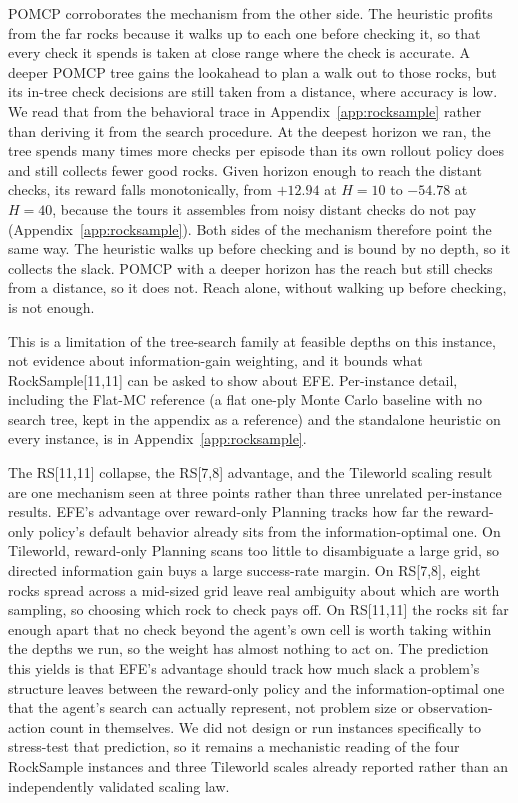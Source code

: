POMCP corroborates the mechanism from the other side. The heuristic profits from the far rocks because it walks up to each one before checking it, so that every check it spends is taken at close range where the check is accurate. A deeper POMCP tree gains the lookahead to plan a walk out to those rocks, but its in-tree check decisions are still taken from a distance, where accuracy is low. We read that from the behavioral trace in Appendix~\ref{app:rocksample} rather than deriving it from the search procedure. At the deepest horizon we ran, the tree spends many times more checks per episode than its own rollout policy does and still collects fewer good rocks. Given horizon enough to reach the distant checks, its reward falls monotonically, from $+12.94$ at $H{=}10$ to $-54.78$ at $H{=}40$, because the tours it assembles from noisy distant checks do not pay (Appendix~\ref{app:rocksample}). Both sides of the mechanism therefore point the same way. The heuristic walks up before checking and is bound by no depth, so it collects the slack. POMCP with a deeper horizon has the reach but still checks from a distance, so it does not. Reach alone, without walking up before checking, is not enough.

This is a limitation of the tree-search family at feasible depths on this instance, not evidence about information-gain weighting, and it bounds what RockSample[11,11] can be asked to show about EFE. Per-instance detail, including the Flat-MC reference (a flat one-ply Monte Carlo baseline with no search tree, kept in the appendix as a reference) and the standalone heuristic on every instance, is in Appendix~\ref{app:rocksample}.

The RS[11,11] collapse, the RS[7,8] advantage, and the Tileworld scaling result are one mechanism seen at three points rather than three unrelated per-instance results. EFE's advantage over reward-only Planning tracks how far the reward-only policy's default behavior already sits from the information-optimal one. On Tileworld, reward-only Planning scans too little to disambiguate a large grid, so directed information gain buys a large success-rate margin. On RS[7,8], eight rocks spread across a mid-sized grid leave real ambiguity about which are worth sampling, so choosing which rock to check pays off. On RS[11,11] the rocks sit far enough apart that no check beyond the agent's own cell is worth taking within the depths we run, so the weight has almost nothing to act on. The prediction this yields is that EFE's advantage should track how much slack a problem's structure leaves between the reward-only policy and the information-optimal one that the agent's search can actually represent, not problem size or observation-action count in themselves. We did not design or run instances specifically to stress-test that prediction, so it remains a mechanistic reading of the four RockSample instances and three Tileworld scales already reported rather than an independently validated scaling law.

